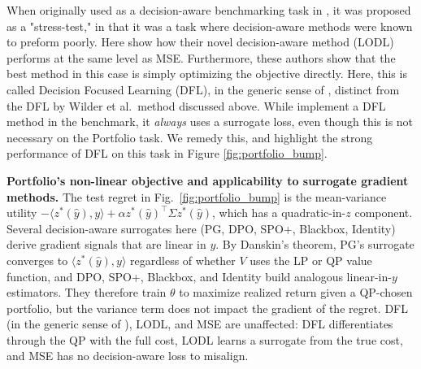 When originally used as a decision-aware benchmarking task in \citet{shahDecisionFocusedLearningDifferentiable2022}, it was proposed as a "stress-test," in that it was a task where decision-aware methods were known to preform poorly. Here \citeauthor{shahDecisionFocusedLearningDifferentiable2022} show how their novel decision-aware method (LODL) performs at the same level as MSE. Furthermore, these authors show that the best method in this case is simply optimizing the objective directly. Here, this is called Decision Focused Learning (DFL), in the generic sense of \citeauthor{shahDecisionFocusedLearningDifferentiable2022}, distinct from the DFL by Wilder et al.\ method discussed above. While \citeauthor{gengBenchmarkingPtOPnO2024} implement a DFL method in the benchmark, it \textit{always} uses a surrogate loss, even though this is not necessary on the Portfolio task. We remedy this, and highlight the strong performance of DFL on this task in Figure \ref{fig:portfolio_bump}.

\textbf{Portfolio's non-linear objective and applicability to surrogate gradient methods.} The test regret in Fig.~\ref{fig:portfolio_bump} is the mean-variance utility $-\langle z^*(\hat y), y\rangle + \alpha z^*(\hat y)^\top \Sigma z^*(\hat y)$, which has a quadratic-in-$z$ component. Several decision-aware surrogates here (PG, DPO, SPO+, Blackbox, Identity) derive gradient signals that are linear in $y$. By Danskin's theorem, PG's surrogate converges to $\langle z^*(\hat y), y\rangle$ regardless of whether $V$ uses the LP or QP value function, and DPO, SPO+, Blackbox, and Identity build analogous linear-in-$y$ estimators. They therefore train $\theta$ to maximize realized return given a QP-chosen portfolio, but the variance term does not impact the gradient of the regret. DFL (in the generic sense of \citet{shahDecisionFocusedLearningDifferentiable2022}), LODL, and MSE are unaffected: DFL differentiates through the QP with the full cost, LODL learns a surrogate from the true cost, and MSE has no decision-aware loss to misalign.

